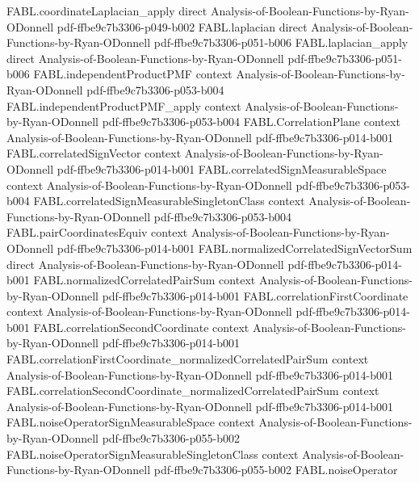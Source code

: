 \begin{theorem}
\proofstep
  {FABL.coordinateLaplacian_apply}
  {direct}
  {Analysis-of-Boolean-Functions-by-Ryan-ODonnell}
  {pdf-ffbe9c7b3306-p049-b002}
\proofstep
  {FABL.laplacian}
  {direct}
  {Analysis-of-Boolean-Functions-by-Ryan-ODonnell}
  {pdf-ffbe9c7b3306-p051-b006}
\proofstep
  {FABL.laplacian_apply}
  {direct}
  {Analysis-of-Boolean-Functions-by-Ryan-ODonnell}
  {pdf-ffbe9c7b3306-p051-b006}
\proofstep
  {FABL.independentProductPMF}
  {context}
  {Analysis-of-Boolean-Functions-by-Ryan-ODonnell}
  {pdf-ffbe9c7b3306-p053-b004}
\proofstep
  {FABL.independentProductPMF_apply}
  {context}
  {Analysis-of-Boolean-Functions-by-Ryan-ODonnell}
  {pdf-ffbe9c7b3306-p053-b004}
\proofstep
  {FABL.CorrelationPlane}
  {context}
  {Analysis-of-Boolean-Functions-by-Ryan-ODonnell}
  {pdf-ffbe9c7b3306-p014-b001}
\proofstep
  {FABL.correlatedSignVector}
  {context}
  {Analysis-of-Boolean-Functions-by-Ryan-ODonnell}
  {pdf-ffbe9c7b3306-p014-b001}
\proofstep
  {FABL.correlatedSignMeasurableSpace}
  {context}
  {Analysis-of-Boolean-Functions-by-Ryan-ODonnell}
  {pdf-ffbe9c7b3306-p053-b004}
\proofstep
  {FABL.correlatedSignMeasurableSingletonClass}
  {context}
  {Analysis-of-Boolean-Functions-by-Ryan-ODonnell}
  {pdf-ffbe9c7b3306-p053-b004}
\proofstep
  {FABL.pairCoordinatesEquiv}
  {context}
  {Analysis-of-Boolean-Functions-by-Ryan-ODonnell}
  {pdf-ffbe9c7b3306-p014-b001}
\proofstep
  {FABL.normalizedCorrelatedSignVectorSum}
  {direct}
  {Analysis-of-Boolean-Functions-by-Ryan-ODonnell}
  {pdf-ffbe9c7b3306-p014-b001}
\proofstep
  {FABL.normalizedCorrelatedPairSum}
  {context}
  {Analysis-of-Boolean-Functions-by-Ryan-ODonnell}
  {pdf-ffbe9c7b3306-p014-b001}
\proofstep
  {FABL.correlationFirstCoordinate}
  {context}
  {Analysis-of-Boolean-Functions-by-Ryan-ODonnell}
  {pdf-ffbe9c7b3306-p014-b001}
\proofstep
  {FABL.correlationSecondCoordinate}
  {context}
  {Analysis-of-Boolean-Functions-by-Ryan-ODonnell}
  {pdf-ffbe9c7b3306-p014-b001}
\proofstep
  {FABL.correlationFirstCoordinate_normalizedCorrelatedPairSum}
  {context}
  {Analysis-of-Boolean-Functions-by-Ryan-ODonnell}
  {pdf-ffbe9c7b3306-p014-b001}
\proofstep
  {FABL.correlationSecondCoordinate_normalizedCorrelatedPairSum}
  {context}
  {Analysis-of-Boolean-Functions-by-Ryan-ODonnell}
  {pdf-ffbe9c7b3306-p014-b001}
\proofstep
  {FABL.noiseOperatorSignMeasurableSpace}
  {context}
  {Analysis-of-Boolean-Functions-by-Ryan-ODonnell}
  {pdf-ffbe9c7b3306-p055-b002}
\proofstep
  {FABL.noiseOperatorSignMeasurableSingletonClass}
  {context}
  {Analysis-of-Boolean-Functions-by-Ryan-ODonnell}
  {pdf-ffbe9c7b3306-p055-b002}
\proofstep
  {FABL.noiseOperator}

\end{theorem}
